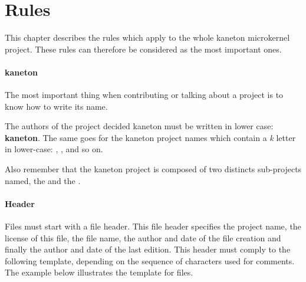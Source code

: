 %
%
%
%
%
%

%
%

\chapter{Rules}
\label{chapter:rules}

This chapter describes the rules which apply to the whole kaneton microkernel
project. These rules can therefore be considered as the most important ones.

\newpage

%
%


\subsubsection{kaneton}

The most important thing when contributing or talking about a project is
to know how to write its name.

The authors of the project decided kaneton must be written in lower case:
\textbf{kaneton}. The same goes for the kaneton project names which contain
a \textit{k} letter in lower-case: , ,  and
so on.

Also remember that the kaneton project is composed of two distincts
sub-projects named, the  and the
.


\subsubsection{Header}

Files must start with a file header. This file header specifies the
project name, the license of this file, the file name, the author and
date of the file creation and finally the author and date of the last
edition. This header must comply to the following template, depending
on the sequence of characters used for comments. The example below illustrates
the template for  files.

